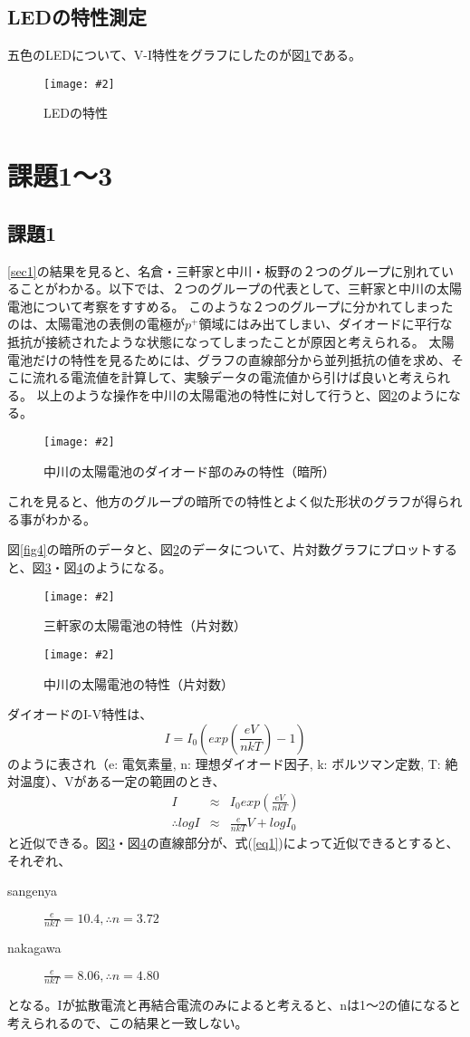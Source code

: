 \documentclass[11pt]{ltjsarticle}
\newcommand{\fg}[3]{
	\begin{figure}
		\texttt{[image: \#2]}
		\caption{#3}
		\label{#1}
	\end{figure}
}
\newcommand{\fr}[1]{図\ref{#1}}
\begin{document}
	\subsection{LEDの特性測定}
		五色のLEDについて、V-I特性をグラフにしたのが\fr{fig8}である。
		\fg{fig8}{resources/led/led.png}{LEDの特性}

\section{課題1〜3}
	\subsection{課題1}
		\ref{sec1}の結果を見ると、名倉・三軒家と中川・板野の２つのグループに別れていることがわかる。以下では、２つのグループの代表として、三軒家と中川の太陽電池について考察をすすめる。
		このような２つのグループに分かれてしまったのは、太陽電池の表側の電極が$p^+$領域にはみ出てしまい、ダイオードに平行な抵抗が接続されたような状態になってしまったことが原因と考えられる。
		太陽電池だけの特性を見るためには、グラフの直線部分から並列抵抗の値を求め、そこに流れる電流値を計算して、実験データの電流値から引けば良いと考えられる。
		以上のような操作を中川の太陽電池の特性に対して行うと、\fr{fig9}のようになる。
		\fg{fig9}{resources/solar/diff/nakagawa.png}{中川の太陽電池のダイオード部のみの特性（暗所）}
		これを見ると、他方のグループの暗所での特性とよく似た形状のグラフが得られる事がわかる。
		
		\fr{fig4}の暗所のデータと、\fr{fig9}のデータについて、片対数グラフにプロットすると、\fr{fig10}・\fr{fig11}のようになる。
		\fg{fig10}{resources/solar/logscale/sangenya.png}{三軒家の太陽電池の特性（片対数）}
		\fg{fig11}{resources/solar/logscale/nakagawa.png}{中川の太陽電池の特性（片対数）}
		
		ダイオードのI-V特性は、
		\[
			I = I_0 \left( exp(\frac{eV}{nkT}) - 1 \right)
		\]
		のように表され（e: 電気素量, n: 理想ダイオード因子, k: ボルツマン定数, T: 絶対温度）、Vがある一定の範囲のとき、
		\begin{eqnarray}
			I & \approx & I_0 exp(\frac{eV}{nkT}) \nonumber \\
			\therefore log I & \approx & \frac{e}{nkT}V + log I_0 \label{eq1}
		\end{eqnarray}
		と近似できる。\fr{fig10}・\fr{fig11}の直線部分が、式(\ref{eq1})によって近似できるとすると、それぞれ、
		\begin{description}
			\item[sangenya] $ \frac{e}{nkT} = 10.4, \therefore n = 3.72 $
			\item[nakagawa] $ \frac{e}{nkT} = 8.06, \therefore n = 4.80 $
		\end{description}
		となる。Iが拡散電流と再結合電流のみによると考えると、nは1〜2の値になると考えられるので、この結果と一致しない。
		
\end{document}
